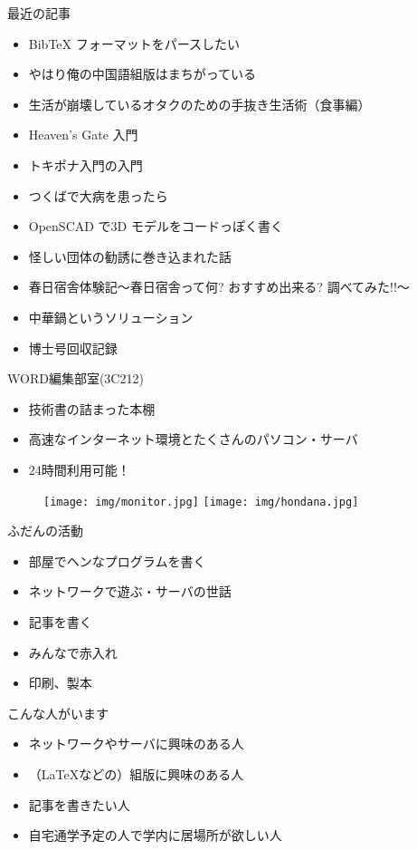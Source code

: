 \documentclass[lualatex]{beamer}
\begin{document}
\begin{frame}{最近の記事}
	\begin{itemize}
		\item BibTeX フォーマットをパースしたい
		\item やはり俺の中国語組版はまちがっている
		\item 生活が崩壊しているオタクのための手抜き生活術（食事編）
		\item Heaven’s Gate 入門
		\item トキポナ入門の入門
		\item つくばで大病を患ったら
		\item OpenSCAD で3D モデルをコードっぽく書く
		\item 怪しい団体の勧誘に巻き込まれた話
		\item 春日宿舎体験記〜春日宿舎って何? おすすめ出来る? 調べてみた!!〜
		\item 中華鍋というソリューション
		\item 博士号回収記録
	\end{itemize}
\end{frame}

\begin{frame}[plain]{WORD編集部室(3C212)}
 \begin{itemize}
  \item 技術書の詰まった本棚
  \item 高速なインターネット環境とたくさんのパソコン・サーバ
  \item 24時間利用可能！
 \end{itemize}
\begin{figure}
 \centering
 \texttt{[image: img/monitor.jpg]}
 \texttt{[image: img/hondana.jpg]}
\end{figure}
\end{frame}

\begin{frame}{ふだんの活動}
	\begin{itemize}
		\item 部屋でヘンなプログラムを書く
		\item ネットワークで遊ぶ・サーバの世話
		\item 記事を書く
		\item みんなで赤入れ
		\item 印刷、製本
	\end{itemize}
\end{frame}

\begin{frame}[plain]{こんな人がいます}
 \begin{itemize}
  \item ネットワークやサーバに興味のある人
  \item （\LaTeX などの）組版に興味のある人
  \item 記事を書きたい人
  \item 自宅通学予定の人で学内に居場所が欲しい人
 \end{itemize}
\end{frame}
\end{document}
